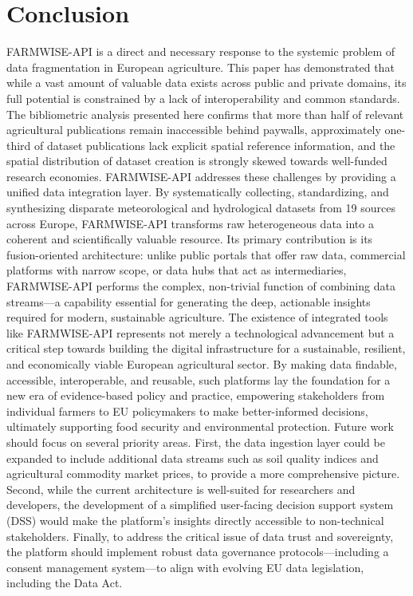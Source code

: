 \documentclass[preprint,12pt,authoryear]{elsarticle}
\begin{document}
\section{Conclusion}
\label{Conclusion}
FARMWISE-API is a direct and necessary response to the systemic problem of data fragmentation in European agriculture. This paper has demonstrated that while a vast amount of valuable data exists across public and private domains, its full potential is constrained by a lack of interoperability and common standards. The bibliometric analysis presented here confirms that more than half of relevant agricultural publications remain inaccessible behind paywalls, approximately one-third of dataset publications lack explicit spatial reference information, and the spatial distribution of dataset creation is strongly skewed towards well-funded research economies.
FARMWISE-API addresses these challenges by providing a unified data integration layer. By systematically collecting, standardizing, and synthesizing disparate meteorological and hydrological datasets from 19 sources across Europe, FARMWISE-API transforms raw heterogeneous data into a coherent and scientifically valuable resource. Its primary contribution is its fusion-oriented architecture: unlike public portals that offer raw data, commercial platforms with narrow scope, or data hubs that act as intermediaries, FARMWISE-API performs the complex, non-trivial function of combining data streams—a capability essential for generating the deep, actionable insights required for modern, sustainable agriculture.
The existence of integrated tools like FARMWISE-API represents not merely a technological advancement but a critical step towards building the digital infrastructure for a sustainable, resilient, and economically viable European agricultural sector. By making data findable, accessible, interoperable, and reusable, such platforms lay the foundation for a new era of evidence-based policy and practice, empowering stakeholders from individual farmers to EU policymakers to make better-informed decisions, ultimately supporting food security and environmental protection.
Future work should focus on several priority areas. First, the data ingestion layer could be expanded to include additional data streams such as soil quality indices and agricultural commodity market prices, to provide a more comprehensive picture. Second, while the current architecture is well-suited for researchers and developers, the development of a simplified user-facing decision support system (DSS) would make the platform's insights directly accessible to non-technical stakeholders. Finally, to address the critical issue of data trust and sovereignty, the platform should implement robust data governance protocols—including a consent management system—to align with evolving EU data legislation, including the Data Act.
\end{document}
